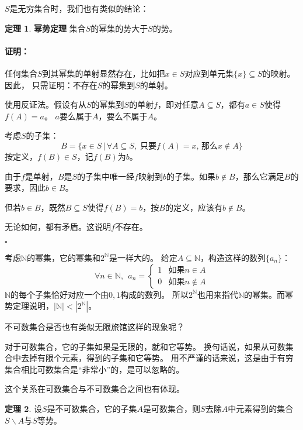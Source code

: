 \documentclass[12pt,UTF8]{ctexbook}
\theoremstyle{definition}
\newtheorem{tm}{定理}[section]
\theoremstyle{plain}
\renewenvironment{proof}{\paragraph{\textbf{证明：}}}{\hfill$\square$}
\begin{document}
$S$是无穷集合时，我们也有类似的结论：
\begin{tm}{\textbf{幂势定理}}
    集合$S$的幂集的势大于$S$的势。
\end{tm}

\begin{proof}
    任何集合$S$到其幂集的单射显然存在，比如把$x\in S$对应到单元集$\{x\}\subseteq S$的映射。因此，
    只需证明：不存在$S$的幂集到$S$的单射。
    
    使用反证法。假设有从$S$的幂集到$S$的单射$f$，即对任意$A\subseteq S$，都有$a\in S$使得$f(A) = a$。
    $a$要么属于$A$，要么不属于$A$。

    考虑$S$的子集：
    $$ B = \{x\in S \, | \, \forall A\subseteq S,\;\mbox{只要} f(A) = x,\,\mbox{那么} x\notin A\}$$
    按定义，$f(B)\in S$，记$f(B)$为$b$。
    
    由于$f$是单射，$B$是$S$的子集中唯一经$f$映射到$b$的子集。如果$b\notin B$，那么它满足$B$的要求，因此$b\in B$。

    但若$b\in B$，既然$B\subseteq S$使得$f(B)=b$，按$B$的定义，应该有$b \notin B$。

    无论如何，都有矛盾。这说明$f$不存在。

\end{proof}

考虑$\mathbb{N}$的幂集，它的幂集和$2^\mathbb{N}$是一样大的。
给定$A\subseteq \mathbb{N}$，构造这样的数列$\{a_n\}$：
$$\forall n \in \mathbb{N},\;\,
a_n = \begin{cases}
    1 & \mbox{如果} n \in A \\
    0 & \mbox{如果} n \notin A
\end{cases}
$$
$\mathbb{N}$的每个子集恰好对应一个由$0,1$构成的数列。
所以$2^\mathbb{N}$也用来指代$\mathbb{N}$的幂集。而幂势定理说明，$|\mathbb{N}| < |2^\mathbb{N}|$。

不可数集合是否也有类似无限旅馆这样的现象呢？

对于可数集合，它的子集如果是无限的，就和它等势。
换句话说，如果从可数集合中去掉有限个元素，得到的子集和它等势。
用不严谨的话来说，这是由于有穷集合相比可数集合是“非常小”的，是可以忽略的。

这个关系在可数集合与不可数集合之间也有体现。

\begin{tm}
    设$S$是不可数集合，它的子集$A$是可数集合，则$S$去除$A$中元素得到的集合$S\backslash A$与$S$等势。
\end{tm}
\end{document}

